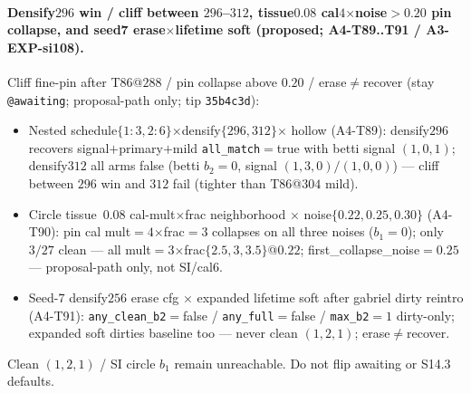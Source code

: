 \documentclass[11pt]{article}
\begin{document}
\paragraph{Densify$296$ win / cliff between $296$--$312$, tissue$0.08$
cal$4$$\times$noise${>}0.20$ pin collapse, and seed7 erase$\times$lifetime
soft (proposed; A4-T89..T91 / A3-EXP-si108).}
Cliff fine-pin after T86@$288$ / pin collapse above $0.20$ /
erase$\neq$recover (stay \texttt{@awaiting}; proposal-path only;
tip \texttt{35b4c3d}):
\begin{itemize}[leftmargin=1.5em]
  \item Nested schedule$\{1{:}3,2{:}6\}$$\times$densify$\{296,312\}$$\times$
  hollow (A4-T89): densify$296$ recovers signal$+$primary$+$mild
  \texttt{all\_match}${=}$true with betti signal $(1,0,1)$; densify$312$
  all arms false (betti $b_2{=}0$, signal $(1,3,0)/(1,0,0)$) --- cliff
  between $296$ win and $312$ fail (tighter than T86@$304$ mild).
  \item Circle tissue~$0.08$ cal-mult$\times$frac neighborhood $\times$
  noise$\{0.22,0.25,0.30\}$ (A4-T90): pin cal mult${=}4$$\times$frac${=}3$
  collapses on all three noises ($b_1{=}0$); only $3/27$ clean --- all
  mult${=}3$$\times$frac$\{2.5,3,3.5\}$@$0.22$; first\_collapse\_noise${=}0.25$
  --- proposal-path only, not SI/cal$6$.
  \item Seed-$7$ densify$256$ erase cfg $\times$ expanded lifetime soft
  after gabriel dirty reintro (A4-T91): \texttt{any\_clean\_b2}${=}$false /
  \texttt{any\_full}${=}$false / \texttt{max\_b2}${=}1$ dirty-only;
  expanded soft dirties baseline too --- never clean $(1,2,1)$;
  erase$\neq$recover.
\end{itemize}
Clean $(1,2,1)$ / SI circle $b_1$ remain unreachable. Do not flip
awaiting or S14.3 defaults.
\end{document}
